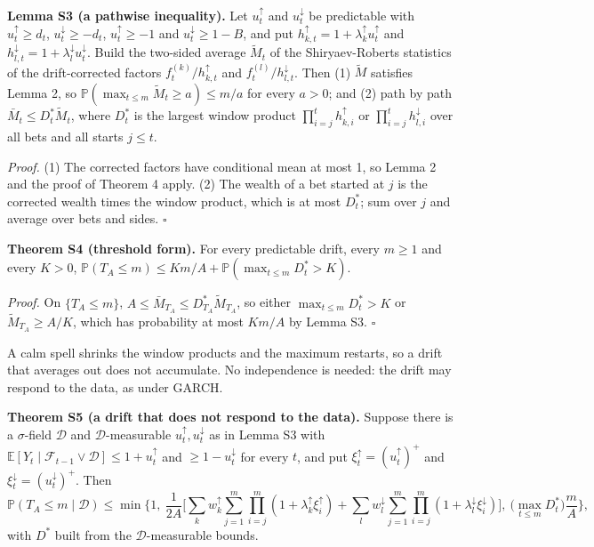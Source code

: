\documentclass[
]{article}
\begin{document}
\textbf{Lemma S3 (a pathwise inequality).} Let \(u_t^{\uparrow}\) and
\(u_t^{\downarrow}\) be predictable with \(u_t^{\uparrow} \ge d_t\),
\(u_t^{\downarrow} \ge -d_t\), \(u_t^{\uparrow} \ge -1\) and
\(u_t^{\downarrow} \ge 1 - B\), and put
\(h_{k,t}^{\uparrow} = 1 + \lambda_k^{\uparrow}u_t^{\uparrow}\) and
\(h_{l,t}^{\downarrow} = 1 + \lambda_l^{\downarrow}u_t^{\downarrow}\).
Build the two-sided average \(\tilde M_t\) of the Shiryaev-Roberts
statistics of the drift-corrected factors
\(f_t^{(k)}/h_{k,t}^{\uparrow}\) and \(f_t^{(l)}/h_{l,t}^{\downarrow}\).
Then (1) \(\tilde M\) satisfies Lemma 2, so
\(\mathbb{P}(\max_{t \le m}\tilde M_t \ge a) \le m/a\) for every
\(a > 0\); and (2) path by path \(\bar M_t \le D_t^\ast \tilde M_t\),
where \(D_t^\ast\) is the largest window product
\(\prod_{i=j}^{t} h_{k,i}^{\uparrow}\) or
\(\prod_{i=j}^{t} h_{l,i}^{\downarrow}\) over all bets and all starts
\(j \le t\).

\emph{Proof.} (1) The corrected factors have conditional mean at most 1,
so Lemma 2 and the proof of Theorem 4 apply. (2) The wealth of a bet
started at \(j\) is the corrected wealth times the window product, which
is at most \(D_t^\ast\); sum over \(j\) and average over bets and sides.
\(\square\)

\textbf{Theorem S4 (threshold form).} For every predictable drift, every
\(m \ge 1\) and every \(K > 0\),
\(\mathbb{P}(T_A \le m) \le K m/A + \mathbb{P}(\max_{t \le m} D_t^\ast > K)\).

\emph{Proof.} On \(\lbrace T_A \le m\rbrace\),
\(A \le \bar M_{T_A} \le D_{T_A}^\ast \tilde M_{T_A}\), so either
\(\max_{t \le m} D_t^\ast > K\) or \(\tilde M_{T_A} \ge A/K\), which has
probability at most \(Km/A\) by Lemma S3. \(\square\)

A calm spell shrinks the window products and the maximum restarts, so a
drift that averages out does not accumulate. No independence is needed:
the drift may respond to the data, as under GARCH.

\textbf{Theorem S5 (a drift that does not respond to the data).} Suppose
there is a \(\sigma\)-field \(\mathcal{D}\) and
\(\mathcal{D}\)-measurable \(u_t^{\uparrow}, u_t^{\downarrow}\) as in
Lemma S3 with
\(\mathbb{E}[Y_t \mid \mathcal{F}_{t-1} \vee \mathcal{D}] \le 1 + u_t^{\uparrow}\)
and \(\ge 1 - u_t^{\downarrow}\) for every \(t\), and put
\(\xi_t^{\uparrow} = (u_t^{\uparrow})^+\) and
\(\xi_t^{\downarrow} = (u_t^{\downarrow})^+\). Then \[
\mathbb{P}(T_A \le m \mid \mathcal{D}) \le \min\Big\lbrace 1,\ \frac{1}{2A}\Big[\sum_k w_k^{\uparrow}\sum_{j=1}^{m}\prod_{i=j}^{m}(1 + \lambda_k^{\uparrow}\xi_i^{\uparrow}) + \sum_l w_l^{\downarrow}\sum_{j=1}^{m}\prod_{i=j}^{m}(1 + \lambda_l^{\downarrow}\xi_i^{\downarrow})\Big],\ \big(\max_{t \le m} D_t^\ast\big)\frac{m}{A}\Big\rbrace,
\] with \(D^\ast\) built from the \(\mathcal{D}\)-measurable bounds.
\end{document}
